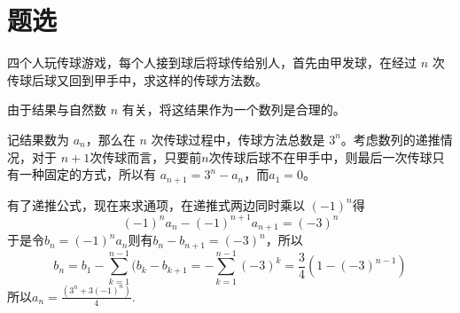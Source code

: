 
\section{题选}
\label{sec:combination-exercises}

\begin{exercise}
  四个人玩传球游戏，每个人接到球后将球传给别人，首先由甲发球，在经过 $n$ 次传球后球又回到甲手中，求这样的传球方法数。
\end{exercise}

由于结果与自然数 $n$ 有关，将这结果作为一个数列是合理的。

记结果数为 $a_n$，那么在 $n$ 次传球过程中，传球方法总数是 $3^n$。考虑数列的递推情况，对于 $n+1$次传球而言，只要前$n$次传球后球不在甲手中，则最后一次传球只有一种固定的方式，所以有 $a_{n+1}=3^n-a_n$，而$a_1=0$。

有了递推公式，现在来求通项，在递推式两边同时乘以 $(-1)^n$得
\begin{displaymath}
  (-1)^na_n-(-1)^{n+1}a_{n+1}=(-3)^n
\end{displaymath}
于是令$b_n=(-1)^na_n$则有$b_n-b_{n+1}=(-3)^n$，所以
\begin{displaymath}
  b_n=b_1-\sum_{k=1}^{n-1}(b_k-b_{k+1}=-\sum_{k=1}^{n-1}(-3)^k=\frac{3}{4}(1-(-3)^{n-1})
\end{displaymath}
所以$a_n=\frac{(3^n+3(-1)^n)}{4}$.


